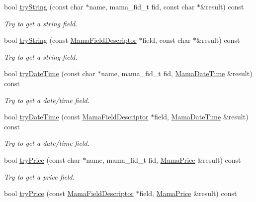 \begin{DoxyCompactItemize}
bool \hyperlink{classWombat_1_1MamaMsg_a3b75fcda7df849f4bdae109656afdb70}{tryString} (const char $\ast$name, mama\_\-fid\_\-t fid, const char $\ast$\&result) const 
\begin{DoxyCompactList}\small\item\em Try to get a string field. \item\end{DoxyCompactList}\item 
bool \hyperlink{classWombat_1_1MamaMsg_a6c57f23554dfdc14ed2d5118d573bebf}{tryString} (const \hyperlink{classWombat_1_1MamaFieldDescriptor}{MamaFieldDescriptor} $\ast$field, const char $\ast$\&result) const 
\begin{DoxyCompactList}\small\item\em Try to get a string field. \item\end{DoxyCompactList}\item 
bool \hyperlink{classWombat_1_1MamaMsg_a10b62ec7fcaf1f12084faa22064540e4}{tryDateTime} (const char $\ast$name, mama\_\-fid\_\-t fid, \hyperlink{classWombat_1_1MamaDateTime}{MamaDateTime} \&result) const 
\begin{DoxyCompactList}\small\item\em Try to get a date/time field. \item\end{DoxyCompactList}\item 
bool \hyperlink{classWombat_1_1MamaMsg_a0143e29b236be22ded82e7b0e93f903c}{tryDateTime} (const \hyperlink{classWombat_1_1MamaFieldDescriptor}{MamaFieldDescriptor} $\ast$field, \hyperlink{classWombat_1_1MamaDateTime}{MamaDateTime} \&result) const 
\begin{DoxyCompactList}\small\item\em Try to get a date/time field. \item\end{DoxyCompactList}\item 
bool \hyperlink{classWombat_1_1MamaMsg_a28618d94be1fb014a65a9afe1a4029cc}{tryPrice} (const char $\ast$name, mama\_\-fid\_\-t fid, \hyperlink{classWombat_1_1MamaPrice}{MamaPrice} \&result) const 
\begin{DoxyCompactList}\small\item\em Try to get a price field. \item\end{DoxyCompactList}\item 
bool \hyperlink{classWombat_1_1MamaMsg_a4280796414232fc0e831f1e47b8a3806}{tryPrice} (const \hyperlink{classWombat_1_1MamaFieldDescriptor}{MamaFieldDescriptor} $\ast$field, \hyperlink{classWombat_1_1MamaPrice}{MamaPrice} \&result) const 

\end{DoxyCompactItemize}
